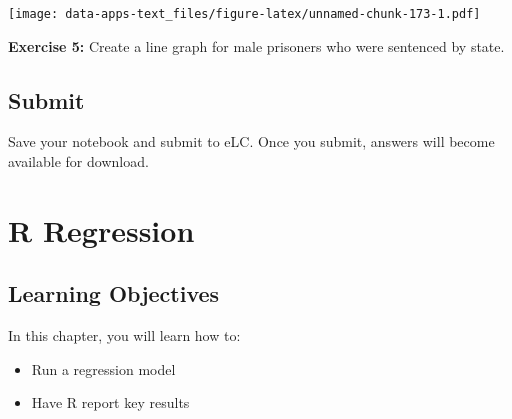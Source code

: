 \documentclass[
]{book}
\newenvironment{Shaded}{\begin{snugshade}}{\end{snugshade}}
\newcommand{\DataTypeTok}[1]{\textcolor[rgb]{0.13,0.29,0.53}{#1}}
\newcommand{\KeywordTok}[1]{\textcolor[rgb]{0.13,0.29,0.53}{\textbf{#1}}}
\newcommand{\NormalTok}[1]{#1}
\newcommand{\OperatorTok}[1]{\textcolor[rgb]{0.81,0.36,0.00}{\textbf{#1}}}
\newcommand{\StringTok}[1]{\textcolor[rgb]{0.31,0.60,0.02}{#1}}
\providecommand{\tightlist}{%
  \setlength{\itemsep}{0pt}\setlength{\parskip}{0pt}}
\newenvironment{learncheck}%
{%
  \par\vspace{\baselineskip}\noindent 
  \color{Exercise}\begin{itshape}%
  \par\vspace{\baselineskip}\noindent\ignorespaces 
}%
{%
  \end{itshape}\ignorespacesafterend 
}
\begin{document}
\begin{Shaded}
\end{Shaded}

\texttt{[image: data-apps-text\_files/figure-latex/unnamed-chunk-173-1.pdf]}

\begin{learncheck}
\textbf{Exercise 5:} Create a line graph for male prisoners who were
sentenced by state.
\end{learncheck}

\hypertarget{submit}{%
\section{Submit}\label{submit}}

Save your notebook and submit to eLC. Once you submit, answers will become available for download.

\hypertarget{r-regression}{%
\chapter{R Regression}\label{r-regression}}

\hypertarget{learning-objectives}{%
\section{Learning Objectives}\label{learning-objectives}}

In this chapter, you will learn how to:

\begin{itemize}
\tightlist
\item
  Run a regression model
\item
  Have R report key results
\end{itemize}
\end{document}
